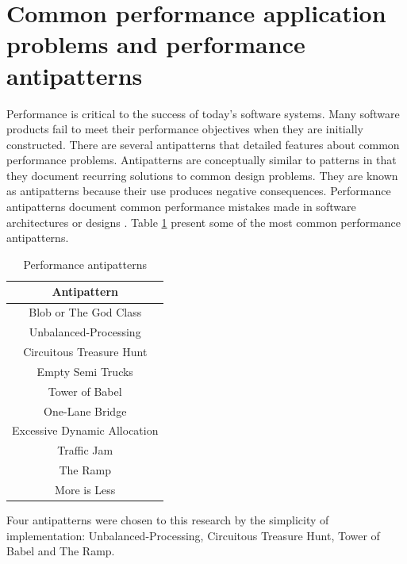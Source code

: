 \section{Common performance application problems and performance antipatterns}
\vspace*{-.05in}

Performance is critical to the success of today’s software systems. Many software products fail to meet their performance objectives when they are initially constructed. There are several antipatterns that detailed features about  common performance problems. Antipatterns are conceptually similar to patterns in that they document recurring solutions to common design problems. They are known as
antipatterns because their use produces negative consequences.  Performance antipatterns document common performance mistakes made in software architectures or designs \cite{brown1998antipatterns}. Table \ref{antipatterns} present some of the most common performance antipatterns.

\begin{table}[h]
\centering
\caption{Performance antipatterns}
\label{antipatterns}
\begin{tabular}{|c|}
\hline
\rowcolor[HTML]{C0C0C0} \textbf{Antipattern}  \\ \hline
Blob or The God Class   \\ \cline{1-1}
Unbalanced-Processing \\ \cline{1-1}
Circuitous Treasure Hunt   \\ \cline{1-1}
Empty Semi Trucks   \\ \cline{1-1}
Tower of Babel   \\ \cline{1-1}
One-Lane Bridge   \\ \cline{1-1}
Excessive Dynamic Allocation   \\ \cline{1-1}
Traffic Jam   \\ \cline{1-1}
The Ramp    \\ \cline{1-1}
More is Less  \multirow{-10}{*}{} \\ \hline
\end{tabular}
\end{table}

Four antipatterns were chosen to this research  by the simplicity of implementation: Unbalanced-Processing, Circuitous Treasure Hunt, Tower of Babel and The Ramp.


